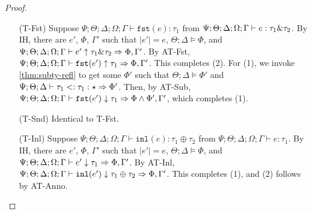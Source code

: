 \begin{proof}
\begin{itemize}
  \item[(T-Fst)] Suppose
  $\Psi ; \Theta ; \Delta ; \Omega ; \Gamma \vdash \texttt{fst}(e) : \tau_1$ from
  $\Psi ; \Theta ; \Delta ; \Omega ; \Gamma \vdash e : \tau_1 \& \tau_2$.
  By IH, there are $e'$, $\Phi$, $\Gamma'$ such that
  $|e'| = e$,
  $\Theta ; \Delta \vDash \Phi$, and
  $\Psi ; \Theta ; \Delta ; \Omega ; \Gamma \vdash e' \uparrow \tau_1 \& \tau_2 \Rightarrow \Phi,\Gamma'$.
  By AT-Fst,
  $\Psi ; \Theta ; \Delta ; \Omega ; \Gamma \vdash \texttt{fst}(e') \uparrow \tau_1 \Rightarrow \Phi,\Gamma'$.
  This completes (2). For (1), we invoke \autoref{thm:subty-refl} to get some $\Phi'$ such that
  $\Theta ; \Delta \vDash \Phi'$ and $\Psi ; \Theta ; \Delta \vdash \tau_1 <: \tau_1 : \star \Rightarrow \Phi'$.
  Then, by AT-Sub,
  $\Psi ; \Theta ; \Delta ; \Omega ; \Gamma \vdash \texttt{fst}(e') \downarrow \tau_1 \Rightarrow \Phi \wedge \Phi',\Gamma'$,
  which completes (1).
  
  
  \item[(T-Snd)] Identical to T-Fst.
  \item[(T-Inl)] Suppose $\Psi ; \Theta ; \Delta ; \Omega ; \Gamma \vdash \texttt{inl}(e) : \tau_1 \oplus \tau_2$ from
  $\Psi ; \Theta ; \Delta ; \Omega ; \Gamma \vdash e : \tau_1$.
  By IH, there are $e'$, $\Phi$, $\Gamma'$ such that
  $|e'| = e$,
  $\Theta ; \Delta \vDash \Phi$, and
  $\Psi ; \Theta ; \Delta ; \Omega ; \Gamma \vdash e' \downarrow \tau_1 \Rightarrow \Phi,\Gamma'$.
  By AT-Inl,
  $\Psi ; \Theta ; \Delta ; \Omega ; \Gamma \vdash \texttt{inl}(e') \downarrow \tau_1 \oplus \tau_2 \Rightarrow \Phi,\Gamma'$.
  This completes (1), and (2) follows by AT-Anno.
  

\end{itemize}
\end{proof}
